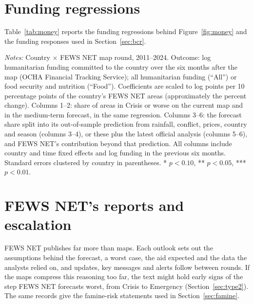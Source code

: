 \documentclass[11pt]{article}
\begin{document}
\begin{appendices}
\section{Funding regressions}\label{app:money}

Table~\ref{tab:money} reports the funding regressions behind Figure~\ref{fig:money} and the funding responses used in Section~\ref{sec:bcr}.

\begin{table}[htbp]
\centering

\caption{Humanitarian funding and FEWS NET's maps and forecasts, within countries}\label{tab:money}
\scriptsize
\resizebox{\textwidth}{!}{}
\par\vspace{4pt}\begin{minipage}{\textwidth}\scriptsize \textit{Notes:} Country $\times$ FEWS NET map round, 2011--2024. Outcome: log humanitarian funding committed to the country over the six months after the map (OCHA Financial Tracking Service); all humanitarian funding (``All'') or food security and nutrition (``Food''). Coefficients are scaled to log points per 10 percentage points of the country's FEWS NET areas (approximately the percent change). Columns 1--2: share of areas in Crisis or worse on the current map and in the medium-term forecast, in the same regression. Columns 3--6: the forecast share split into its out-of-sample prediction from rainfall, conflict, prices, country and season (columns 3--4), or these plus the latest official analysis (columns 5--6), and FEWS NET's contribution beyond that prediction. All columns include country and time fixed effects and log funding in the previous six months. Standard errors clustered by country in parentheses. * $p<0.10$, ** $p<0.05$, *** $p<0.01$.
\end{minipage}

\end{table}

\section{FEWS NET's reports and escalation}\label{app:text}

FEWS NET publishes far more than maps. Each outlook sets out the assumptions behind the forecast, a worst case, the aid expected and the data the analysts relied on, and updates, key messages and alerts follow between rounds. If the maps compress this reasoning too far, the text might hold early signs of the step FEWS NET forecasts worst, from Crisis to Emergency (Section~\ref{sec:type2}). The same records give the famine-risk statements used in Section~\ref{sec:famine}.


\end{appendices}
\end{document}
